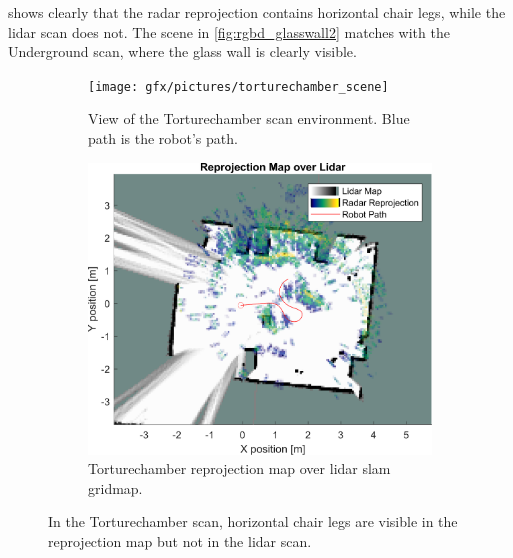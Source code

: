  shows clearly that the radar reprojection contains horizontal chair legs, while the lidar scan does not. The scene in \cref{fig:rgbd_glasswall2} matches with the Underground scan, where the glass wall is clearly visible.

\begin{figure}
    \begin{subfigure}[t]{.485\textwidth}
        \centering
        \texttt{[image: gfx/pictures/torturechamber\_scene]}
        \caption{View of the Torturechamber scan environment. Blue path is the robot's path.}
        \label{fig:chairs_scene}
    \end{subfigure}%
    \hfill%
    \begin{subfigure}[t]{.485\textwidth}
        \centering
        \includegraphics[max width=\textwidth]{gfx/results/torturechamber_map}
        \caption{Torturechamber reprojection map over lidar slam gridmap.}
        \label{fig:chairs_map}
    \end{subfigure}%
    \caption{In the Torturechamber scan, horizontal chair legs are visible in the reprojection map but not in the lidar scan.}
    \label{fig:chairlegs}
\end{figure}


